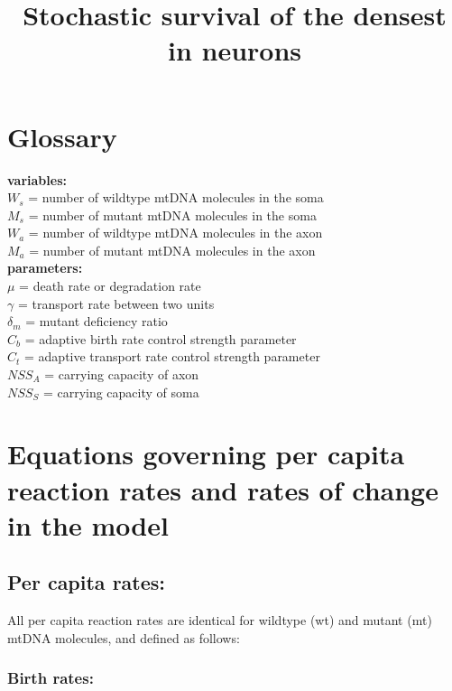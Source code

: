 \documentclass[]{article}
\title{Stochastic survival of the densest in neurons}
\author{}
\begin{document}
\maketitle
	

\section{Glossary}
	
	\noindent \textbf{variables:} \\
	$W_s$ = number of wildtype mtDNA molecules in the soma \\
	$M_s$ = number of mutant mtDNA molecules in the soma \\
	$W_a$ = number of wildtype mtDNA molecules in the axon \\
	$M_a$ = number of mutant mtDNA molecules in the axon \\
	
	\noindent \textbf{parameters:} \\
	$\mu$ = death rate or degradation rate \\
	$\gamma$ = transport rate between two units \\
	$\delta_m$ = mutant deficiency ratio \\
	$C_b$ = adaptive birth rate control strength parameter \\
	$C_t$ = adaptive transport rate control strength parameter \\
	$NSS_A$ = carrying capacity of axon \\
	$NSS_S$ = carrying capacity of soma \\
	
\pagebreak	
\section{Equations governing per capita reaction rates and rates of change in the model}
	
	\subsection{Per capita rates:}
	
	All per capita reaction rates are identical for wildtype (wt) and mutant (mt) mtDNA molecules, and defined as follows:

	\subsubsection{Birth rates:}
	
\end{document}
